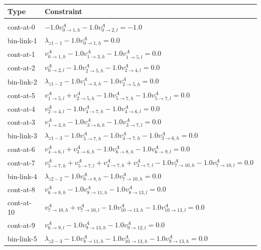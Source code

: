 \documentclass[11pt]{article}
\begin{document}
\begin{tabular}{l l}
\textbf{Type} & \textbf{Constraint}\\\hline\\
    cont-at-0 & $-1.0 v^A_{0 \rightarrow 1, h} -1.0 v^A_{0 \rightarrow 2, l} = -1.0$\\
    bin-link-1 & $\lambda_{z1-1} -1.0 v^A_{0 \rightarrow 1, h} = 0.0$\\
    cont-at-1 & $v^A_{0 \rightarrow 1, h} -1.0 v^A_{1 \rightarrow 3, h} -1.0 v^A_{1 \rightarrow 5, l} = 0.0$\\
    cont-at-2 & $v^A_{0 \rightarrow 2, l} -1.0 v^A_{2 \rightarrow 5, h} -1.0 v^A_{2 \rightarrow 4, l} = 0.0$\\
    bin-link-2 & $\lambda_{z1-2} -1.0 v^A_{1 \rightarrow 3, h} -1.0 v^A_{2 \rightarrow 5, h} = 0.0$\\
    cont-at-5 & $v^A_{1 \rightarrow 5, l} + v^A_{2 \rightarrow 5, h} -1.0 v^A_{5 \rightarrow 7, h} -1.0 v^A_{5 \rightarrow 7, l} = 0.0$\\
    cont-at-4 & $v^A_{2 \rightarrow 4, l} -1.0 v^A_{4 \rightarrow 7, h} -1.0 v^A_{4 \rightarrow 6, l} = 0.0$\\
    cont-at-3 & $v^A_{1 \rightarrow 3, h} -1.0 v^A_{3 \rightarrow 6, h} -1.0 v^A_{3 \rightarrow 7, l} = 0.0$\\
    bin-link-3 & $\lambda_{z1-3} -1.0 v^A_{5 \rightarrow 7, h} -1.0 v^A_{4 \rightarrow 7, h} -1.0 v^A_{3 \rightarrow 6, h} = 0.0$\\
    cont-at-6 & $v^A_{4 \rightarrow 6, l} + v^A_{3 \rightarrow 6, h} -1.0 v^A_{6 \rightarrow 8, h} -1.0 v^A_{6 \rightarrow 9, l} = 0.0$\\
    cont-at-7 & $v^A_{5 \rightarrow 7, h} + v^A_{5 \rightarrow 7, l} + v^A_{4 \rightarrow 7, h} + v^A_{3 \rightarrow 7, l} -1.0 v^A_{7 \rightarrow 10, h} -1.0 v^A_{7 \rightarrow 10, l} = 0.0$\\
    bin-link-4 & $\lambda_{z2-2} -1.0 v^A_{6 \rightarrow 8, h} -1.0 v^A_{7 \rightarrow 10, h} = 0.0$\\
    cont-at-8 & $v^A_{6 \rightarrow 8, h} -1.0 v^A_{8 \rightarrow 11, h} -1.0 v^A_{8 \rightarrow 13, l} = 0.0$\\
    cont-at-10 & $v^A_{7 \rightarrow 10, h} + v^A_{7 \rightarrow 10, l} -1.0 v^A_{10 \rightarrow 13, h} -1.0 v^A_{10 \rightarrow 13, l} = 0.0$\\
    cont-at-9 & $v^A_{6 \rightarrow 9, l} -1.0 v^A_{9 \rightarrow 13, h} -1.0 v^A_{9 \rightarrow 12, l} = 0.0$\\
    bin-link-5 & $\lambda_{z2-3} -1.0 v^A_{8 \rightarrow 11, h} -1.0 v^A_{10 \rightarrow 13, h} -1.0 v^A_{9 \rightarrow 13, h} = 0.0$\\

\end{tabular}
\end{document}
